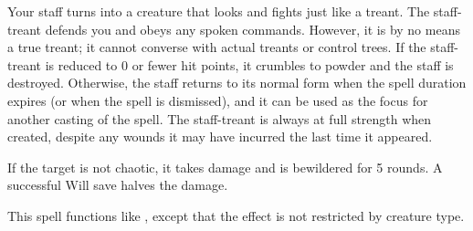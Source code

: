 \spellrng{\rngtouch}
\begin{spelleffect}
  Your staff turns into a creature that looks and fights just like a treant. The staff-treant defends you and obeys any spoken commands. However, it is by no means a true treant; it cannot converse with actual treants or control trees. If the staff-treant is reduced to 0 or fewer hit points, it crumbles to powder and the staff is destroyed. Otherwise, the staff returns to its normal form when the spell duration expires (or when the spell is dismissed), and it can be used as the focus for another casting of the spell. The staff-treant is always at full strength when created, despite any wounds it may have incurred the last time it appeared.
\end{spelleffect}

\spellrng{\rngmed}
\begin{spelleffect}
  If the target is not chaotic, it takes damage and is bewildered for 5 rounds. A successful Will save halves the damage.
\end{spelleffect}

\begin{spelleffect}
  This spell functions like , except that the effect is not restricted by creature type.
\end{spelleffect}

